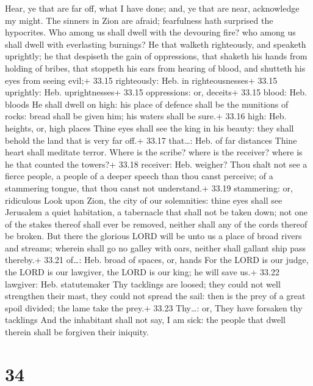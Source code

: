  Hear, ye that are far off, what I have done; and, ye
that are near, acknowledge my might.  The sinners in Zion
are afraid; fearfulness hath surprised the hypocrites. Who among us
shall dwell with the devouring fire? who among us shall dwell with
everlasting burnings?  He that walketh righteously, and
speaketh uprightly; he that despiseth the gain of oppressions, that
shaketh his hands from holding of bribes, that stoppeth his ears from
hearing of blood, and shutteth his eyes from seeing evil;+ 33.15
righteously: Heb. in righteousnesses+ 33.15 uprightly: Heb.
uprightnesses+ 33.15 oppressions: or, deceits+ 33.15 blood: Heb. bloods
 He shall dwell on high: his place of defence shall be the
munitions of rocks: bread shall be given him; his waters shall be sure.+
33.16 high: Heb. heights, or, high places  Thine eyes shall
see the king in his beauty: they shall behold the land that is very far
off.+ 33.17 that\ldots: Heb. of far distances  Thine heart
shall meditate terror. Where is the scribe? where is the receiver? where
is he that counted the towers?+ 33.18 receiver: Heb. weigher?
 Thou shalt not see a fierce people, a people of a deeper
speech than thou canst perceive; of a stammering tongue, that thou canst
not understand.+ 33.19 stammering: or, ridiculous  Look
upon Zion, the city of our solemnities: thine eyes shall see Jerusalem a
quiet habitation, a tabernacle that shall not be taken down; not one of
the stakes thereof shall ever be removed, neither shall any of the cords
thereof be broken.  But there the glorious LORD will be
unto us a place of broad rivers and streams; wherein shall go no galley
with oars, neither shall gallant ship pass thereby.+ 33.21 of\ldots:
Heb. broad of spaces, or, hands  For the LORD is our judge,
the LORD is our lawgiver, the LORD is our king; he will save us.+ 33.22
lawgiver: Heb. statutemaker  Thy tacklings are loosed; they
could not well strengthen their mast, they could not spread the sail:
then is the prey of a great spoil divided; the lame take the prey.+
33.23 Thy\ldots: or, They have forsaken thy tacklings  And
the inhabitant shall not say, I am sick: the people that dwell therein
shall be forgiven their iniquity.

\hypertarget{section-33}{%
\section{34}\label{section-33}}

